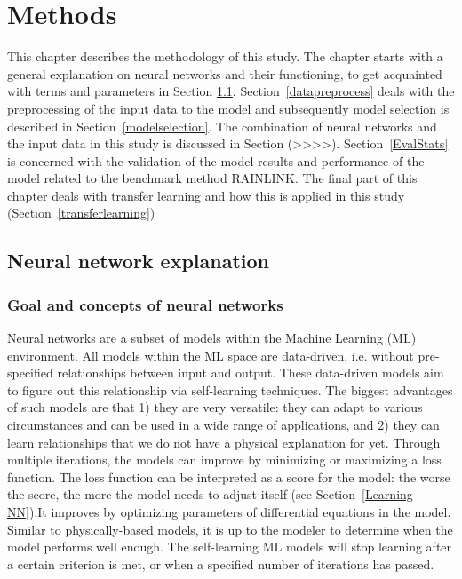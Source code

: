 \documentclass[twocolumn, 10pt, a4paper]{memoir}
\begin{document}
	\chapter{Methods} \label{ch: methods}
	This chapter describes the methodology of this study. The chapter starts with a general explanation on neural networks and their functioning, to get acquainted with terms and parameters in Section \ref{NN explain}. Section~\ref{datapreprocess} deals with the preprocessing of the input data to the model and subsequently model selection is described in Section~\ref{modelselection}. The combination of neural networks and the input data in this study is discussed in Section (>>>>). Section~\ref{EvalStats} is concerned with the validation of the model results and performance of the model related to the benchmark method RAINLINK. The final part of this chapter deals with transfer learning and how this is applied in this study (Section~\ref{transferlearning})
	\section{Neural network explanation} \label{NN explain}
	\subsection{Goal and concepts of neural networks} \label{NNConcepts}
	Neural networks are a subset of models within the Machine Learning (ML) environment. All models within the ML space are data-driven, i.e. without pre-specified relationships between input and output. These data-driven models aim to figure out this relationship via self-learning techniques.
	The biggest advantages of such models are that 1) they are very versatile: they can adapt to various circumstances and can be used in a wide range of applications, and 2) they can learn relationships that we do not have a physical explanation for yet. Through multiple iterations, the models can improve by minimizing or maximizing a loss function. The loss function can be interpreted as a score for the model: the worse the score, the more the model needs to adjust itself (see Section~\ref{Learning NN}).It improves by optimizing parameters of differential equations in the model. Similar to physically-based models, it is up to the modeler to determine when the model performs well enough. The self-learning ML models will stop learning after a certain criterion is met, or when a specified number of iterations has passed.
	
\end{document}
